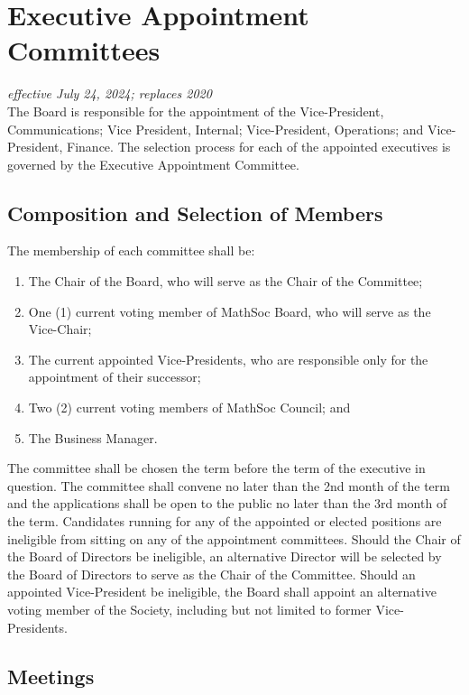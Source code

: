 \section{Executive Appointment Committees}
\emph{effective July 24, 2024; replaces 2020}\\

The Board is responsible for the appointment of the Vice-President, Communications; Vice President, Internal; Vice-President, Operations; and Vice-President, Finance.
The selection process for each of the appointed executives is governed by the Executive Appointment Committee.

\subsection{Composition and Selection of Members}

The membership of each committee shall be:
\begin{enumerate}
	\item The Chair of the Board, who will serve as the Chair of the Committee;
	\item One (1) current voting member of MathSoc Board, who will serve as the Vice-Chair;
	\item The current appointed Vice-Presidents, who are responsible only for the appointment of their successor;
	\item Two (2) current voting members of MathSoc Council; and
	\item The Business Manager.
\end{enumerate}

The committee shall be chosen the term before the term of the executive in question.
The committee shall convene no later than the 2nd month of the term and the applications shall be open to the public no later than the 3rd month of the term.
Candidates running for any of the appointed or elected positions are ineligible from sitting on any of the appointment committees.
Should the Chair of the Board of Directors be ineligible, an alternative Director will be selected by the Board of Directors to serve as the Chair of the Committee.
Should an appointed Vice-President be ineligible, the Board shall appoint an alternative voting member of the Society, including but not limited to former Vice-Presidents.

\subsection{Meetings}

